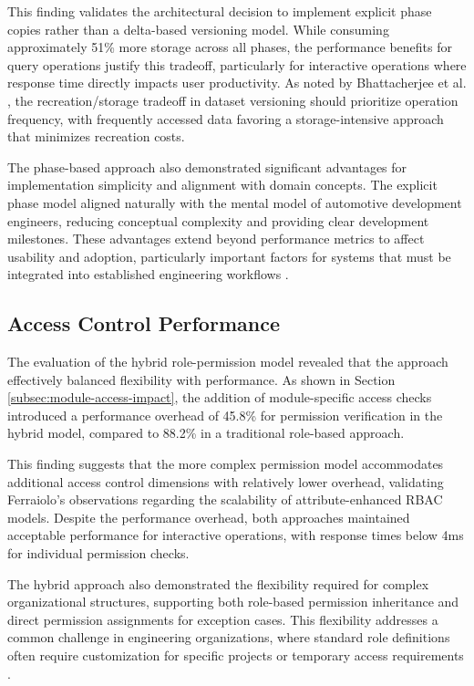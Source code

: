 This finding validates the architectural decision to implement explicit phase copies rather than a delta-based versioning model. While consuming approximately 51\% more storage across all phases, the performance benefits for query operations justify this tradeoff, particularly for interactive operations where response time directly impacts user productivity. As noted by Bhattacherjee et al. \cite{bhattacherjee2015principles}, the recreation/storage tradeoff in dataset versioning should prioritize operation frequency, with frequently accessed data favoring a storage-intensive approach that minimizes recreation costs.

The phase-based approach also demonstrated significant advantages for implementation simplicity and alignment with domain concepts. The explicit phase model aligned naturally with the mental model of automotive development engineers, reducing conceptual complexity and providing clear development milestones. These advantages extend beyond performance metrics to affect usability and adoption, particularly important factors for systems that must be integrated into established engineering workflows \cite{nielsen1994usability}.

\subsection{Access Control Performance}
\label{subsec:access-control-performance}

The evaluation of the hybrid role-permission model revealed that the approach effectively balanced flexibility with performance. As shown in Section \ref{subsec:module-access-impact}, the addition of module-specific access checks introduced a performance overhead of 45.8\% for permission verification in the hybrid model, compared to 88.2\% in a traditional role-based approach.

This finding suggests that the more complex permission model accommodates additional access control dimensions with relatively lower overhead, validating Ferraiolo's observations \cite{ferraiolo2011policy} regarding the scalability of attribute-enhanced \ac{RBAC} models. Despite the performance overhead, both approaches maintained acceptable performance for interactive operations, with response times below 4ms for individual permission checks.

The hybrid approach also demonstrated the flexibility required for complex organizational structures, supporting both role-based permission inheritance and direct permission assignments for exception cases. This flexibility addresses a common challenge in engineering organizations, where standard role definitions often require customization for specific projects or temporary access requirements \cite{sandhu1997arbac97}.

